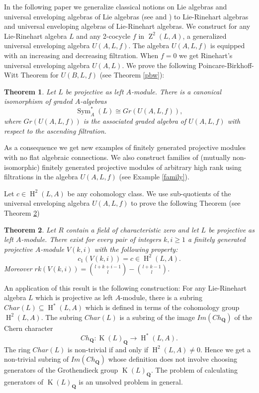 \documentclass{amsart}
\theoremstyle{plain}
\newtheorem{theorem}{Theorem}[section]
\theoremstyle{definition}
\theoremstyle{remark}
\numberwithin{equation}{theorem}
\begin{document}
In the following paper we generalize classical notions on Lie algebras and universal enveloping algebras
of Lie algebras (see \cite{rinehart} and \cite{sridharan}) 
to Lie-Rinehart algebras and universal enveloping algebras of Lie-Rinehart algebras. We construct for any Lie-Rinehart 
algebra $L$
and any 2-cocycle $f$ in ${\operatorname{Z}}^2(L,{A})$, 
a generalized universal enveloping algebra $U({A},L,f)$. The algebra $U({A},L,f)$ is equipped with 
an increasing and decreasing filtration.
When $f=0$ we get Rinehart's universal enveloping algebra
$U({A},L)$. We prove the following Poincare-Birkhoff-Witt Theorem for $U(B,L,f)$ (see Theorem \ref{pbw}): 

\begin{theorem} Let $L$ be projective as left ${A}$-module.
There is a canonical isomorphism of graded ${A}$-algebras
\[ {\operatorname{Sym} }^*_{A}(L)\cong Gr(U({A},L,f)) ,\]
where $Gr(U({A},L,f))$ is the associated graded algebra of $U({A},L,f)$ with respect to the ascending filtration.
\end{theorem}

As a consequence we get 
new examples of finitely generated projective modules with no flat algebraic connections. We also construct
families of (mutually non-isomorphic) finitely generated projective modules of arbitrary high rank using 
filtrations in the algebra $U({A},L,f)$  (see Example \ref{family}).

Let $c\in {\operatorname{H} }^2(L,{A})$ be any cohomology class.
We use sub-quotients of the universal enveloping algebra  $U({A},L,f)$ to  prove the following Theorem (see Theorem \ref{main}) 

\begin{theorem} Let ${R}$ contain a field of characteristic zero and let $L$ be projective as left ${A}$-module.
\label{main} There exist for every pair of integers $k,i\geq 1$ a finitely generated projective ${A}$-module
$V(k,i)$ with the following property: 
\[ c_1(V(k,i))= c \in {\operatorname{H} }^2(L,{A}).\]
Moreover $rk(V(k,i))=\binom{l+k+i-1}{l}-\binom{l+k-1}{l}$.
\end{theorem}

An application of this result is the following construction:
For any Lie-Rinehart algebra $L$ which is projective as left ${A}$-module, 
there is a subring $Char(L)\subseteq {\operatorname{H} }^*(L,{A})$ which is defined in terms of the cohomology group ${\operatorname{H} }^2(L,{A})$.
The subring $Char(L)$ is a subring of the image $Im(Ch_{\mathbf{Q} })$ of the Chern character
\[ Ch_{\mathbf{Q} }:{\operatorname{K}}(L)_{\mathbf{Q} }\rightarrow {\operatorname{H} }^*(L,{A}) .\]
The ring $Char(L)$ is non-trivial if and only if ${\operatorname{H} }^2(L,{A})\neq 0$. Hence 
we get a non-trivial subring of $Im(Ch_{\mathbf{Q} })$ whose definition does not involve
choosing generators of the Grothendieck group ${\operatorname{K}}(L)_{\mathbf{Q} }$. The problem of calculating generators of ${\operatorname{K}}(L)_{\mathbf{Q} }$ 
is an unsolved problem in general.
\end{document}
